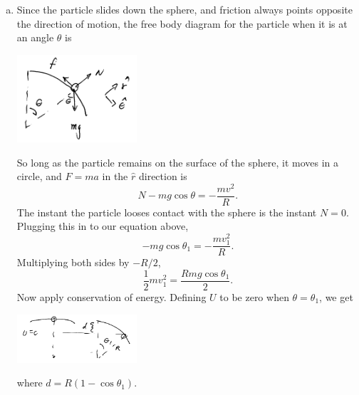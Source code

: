 \documentclass{esg8012exam}
\begin{document}
\begin{solution}
  \begin{enumerate}[(a)]
    \item Since the particle slides down the sphere, and friction always points opposite the direction of motion, the free body diagram for the particle when it is at an angle $\theta$ is
      \begin{center}\includegraphics[width=0.35\textwidth]{exam2_s2_1}\end{center}
      So long as the particle remains on the surface of the sphere, it moves in a circle, and $F = ma$ in the $\hat r$ direction is
      \begin{equation*} N - m g \cos\theta = -\frac{mv^2}{R}. \end{equation*}
      The instant the particle looses contact with the sphere is the instant $N = 0$.  Plugging this in to our equation above,
      \begin{equation*} -mg \cos\theta_1 = -\frac{mv_1^2}{R}. \end{equation*}%
      Multiplying both sides by $-R / 2$,
      \begin{equation} \frac12 m v_1^2 = \frac{R mg \cos\theta_1}{2}. \label{eq:2:F=ma_loose_contact_changed} \end{equation}
      Now apply conservation of energy.  Defining $U$ to be zero when $\theta = \theta_1$, we get
      \begin{center}\includegraphics[width=0.35\textwidth]{exam2_s2_2}\end{center}
      where $d = R(1 - \cos\theta_1)$.
      

\end{enumerate}
\end{solution}
\end{document}
